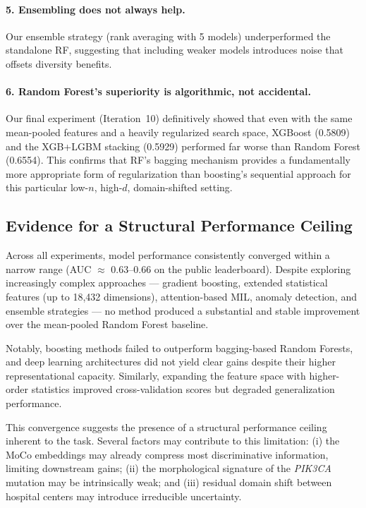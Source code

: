 \documentclass[11pt,a4paper]{article}
\begin{document}
\paragraph{5. Ensembling does not always help.}
Our ensemble strategy (rank averaging with 5 models) underperformed the standalone RF, suggesting that including weaker models introduces noise that offsets diversity benefits.

\paragraph{6. Random Forest's superiority is algorithmic, not accidental.}
Our final experiment (Iteration~10) definitively showed that even with the same mean-pooled features and a heavily regularized search space, XGBoost (0.5809) and the XGB+LGBM stacking (0.5929) performed far worse than Random Forest (0.6554). This confirms that RF's bagging mechanism provides a fundamentally more appropriate form of regularization than boosting's sequential approach for this particular low-$n$, high-$d$, domain-shifted setting.

\subsection{Evidence for a Structural Performance Ceiling}

Across all experiments, model performance consistently converged within a narrow range (AUC $\approx$ 0.63–0.66 on the public leaderboard). 
Despite exploring increasingly complex approaches — gradient boosting, extended statistical features (up to 18,432 dimensions), attention-based MIL, anomaly detection, and ensemble strategies — no method produced a substantial and stable improvement over the mean-pooled Random Forest baseline.

Notably, boosting methods failed to outperform bagging-based Random Forests, and deep learning architectures did not yield clear gains despite their higher representational capacity. 
Similarly, expanding the feature space with higher-order statistics improved cross-validation scores but degraded generalization performance.

This convergence suggests the presence of a structural performance ceiling inherent to the task. 
Several factors may contribute to this limitation: (i) the MoCo embeddings may already compress most discriminative information, limiting downstream gains; (ii) the morphological signature of the \textit{PIK3CA} mutation may be intrinsically weak; and (iii) residual domain shift between hospital centers may introduce irreducible uncertainty.
\end{document}
